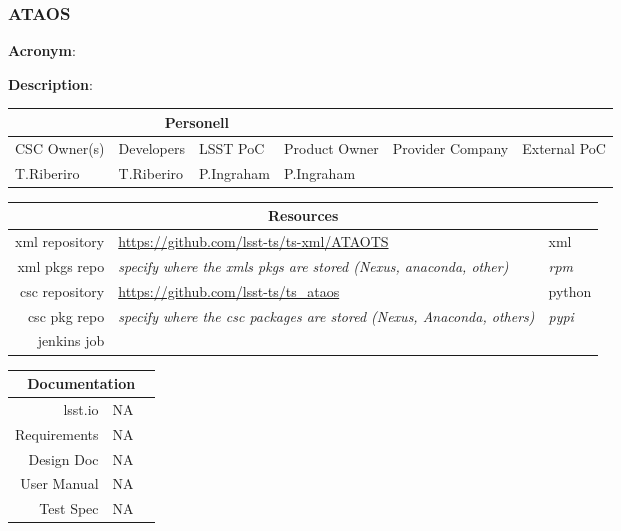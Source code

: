 \subsubsection{ATAOS}

\textbf{Acronym}: 

\textbf{Description}:

\begin{longtable}[]{p{2cm}p{2cm}p{2cm}p{2cm}p{2cm}p{2cm}}
\hline
\multicolumn{4}{c}{\textbf{Personell}} \\ \hline
CSC Owner(s) & Developers & LSST PoC   & Product Owner & Provider Company & External PoC \\ \hline
T.Riberiro   & T.Riberiro & P.Ingraham & P.Ingraham  & &  \\ \hline
\end{longtable}

\begin{longtable}[]{rll}
\hline
\multicolumn{3}{c}{\textbf{Resources}} \\ \hline
xml repository & \url{https://github.com/lsst-ts/ts-xml/ATAOTS} & xml \\ \hline
xml pkgs repo  & \textit{specify where the xmls pkgs are stored (Nexus, anaconda, other)} & \textit{rpm} \\ \hline
csc repository & \url{https://github.com/lsst-ts/ts_ataos} & python \\ \hline
csc pkg repo   & \textit{specify where the csc packages are stored (Nexus, Anaconda, others)} & \textit{pypi}\\ \hline
\hline
jenkins job    & & \\ \hline
\end{longtable}

\begin{longtable}[]{rll}
\hline
\multicolumn{3}{c}{\textbf{Documentation}} \\ \hline
lsst.io & NA & \\ \hline
Requirements & NA & \\ \hline
Design Doc & NA & \\ \hline
User Manual & NA & \\ \hline
Test Spec & NA & \\ \hline
\end{longtable}
